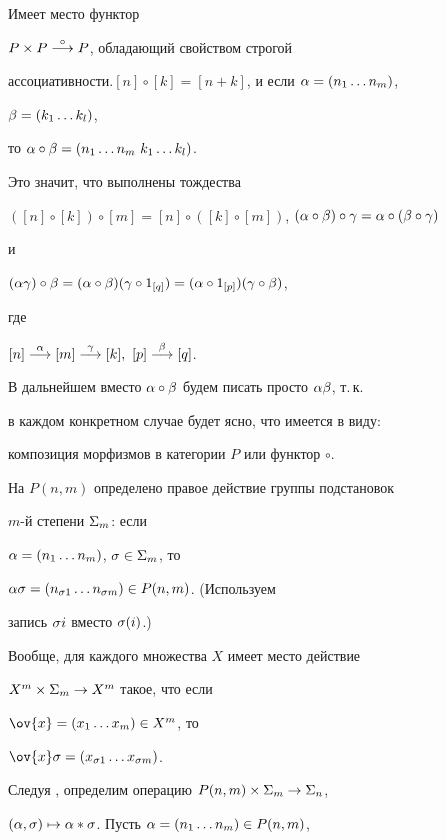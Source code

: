 Имеет место функтор


$P\times P \overset{\circ}{\longrightarrow}{} P$, обладающий свойством строгой 


ассоциативности.\linebreak $[n]\circ [k]=[n+k]$, и если $\alpha=(n_1\dotsc n_m)$,


$\beta=(k_1\dotsc k_l)$,


то $\alpha\circ\beta = (n_1\dotsc n_m\ k_1\dotsc k_l)$.


Это значит, что выполнены тождества


$([n]\circ [k])\circ [m]=


[n]\circ ([k]\circ [m])$, $(\al\circ\be )\circ\g =\al\circ (\be\circ\g )$


и


$(\al\g)\circ\be=(\al\circ\be)(\g\circ 1_{[q]})=(\al\circ 1_{[p]})


(\g\circ\be )$,


где


$[n]\ar {\al } [m]\ar {\g } [k],\ [p]\ar{\be } [q]$.





В дальнейшем вместо $\alpha\circ\beta$ будем писать просто $\alpha\beta$, т.\,к.


в каждом конкретном случае будет ясно, что имеется в виду:


композиция морфизмов в категории $P$ или функтор $\circ$.








На $P(n,m)$ определено правое действие группы подстановок


$m$-й степени $\Sigma_m$: если


$\alpha=(n_1\dotsc n_m)$, $\sigma\in\Sigma_m$, то


$\alpha\sigma=(n_{\sigma 1}\dotsc n_{\sigma m})\in P(n,m)$. (Используем


запись $\sigma i$ вместо $\sigma(i)$.)


Вообще, для каждого множества $X$ имеет место действие


$X^m\times\Sigma_m\to X^m$ такое, что если


$\ov{x}=(x_1\dotsc x_m)\in X^m$, то


$\ov{x}\s=(x_{\s 1}\dotsc x_{\s m})$.





Следуя \cite{TK}, определим операцию $P(n,m)\times\Sigma_m\to \Sigma_n$,


$(\alpha,\sigma)\mapsto \alpha \ast \sigma$. Пусть $\alpha=(n_1\dotsc n_m)\in P(n,m)$,


